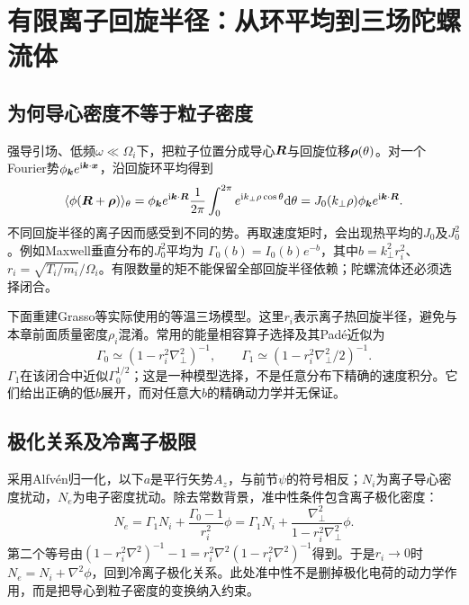 \documentclass[UTF8,a4paper,11pt,openany,fontset=fandol]{ctexbook}
\begin{document}

\section{有限离子回旋半径：从环平均到三场陀螺流体}
\subsection{为何导心密度不等于粒子密度}
强导引场、低频$\omega\ll\Omega_i$下，把粒子位置分成导心$\bm{R}$与回旋位移$\bm{\rho}(\theta)$。对一个Fourier势$\phi_{\bm{k}}e^{\mathrm i\bm{k}\cdot\bm{x}}$，沿回旋环平均得到
\begin{equation}
 \langle\phi(\bm{R}+\bm{\rho})\rangle_\theta
 =\phi_{\bm{k}}e^{\mathrm i\bm{k}\cdot\bm{R}}
 \frac1{2\pi}\int_0^{2\pi}e^{\mathrm i k_\perp\rho\cos\theta}\mathrm d\theta
 =J_0(k_\perp\rho)\phi_{\bm{k}}e^{\mathrm i\bm{k}\cdot\bm{R}}.
\end{equation}
不同回旋半径的离子因而感受到不同的势。再取速度矩时，会出现热平均的$J_0$及$J_0^2$。例如Maxwell垂直分布的$J_0^2$平均为
$\Gamma_0(b)=I_0(b)e^{-b}$，其中$b=k_\perp^2r_i^2$、$r_i=\sqrt{T_i/m_i}/\Omega_i$。有限数量的矩不能保留全部回旋半径依赖；陀螺流体还必须选择闭合。

下面重建Grasso等实际使用的等温三场模型。这里$r_i$表示离子热回旋半径，避免与本章前面质量密度$\rho_i$混淆。常用的能量相容算子选择及其Pad\'e近似为
\begin{equation}
 \Gamma_0\simeq(1-r_i^2\nabla_\perp^2)^{-1},\qquad
 \Gamma_1\simeq(1-r_i^2\nabla_\perp^2/2)^{-1}.
\end{equation}
$\Gamma_1$在该闭合中近似$\Gamma_0^{1/2}$；这是一种模型选择，不是任意分布下精确的速度积分。它们给出正确的低$b$展开，而对任意大$b$的精确动力学并无保证。

\subsection{极化关系及冷离子极限}
采用Alfvén归一化，以下$a$是平行矢势$A_z$，与前节$\psi$的符号相反；$N_i$为离子导心密度扰动，$N_e$为电子密度扰动。除去常数背景，准中性条件包含离子极化密度：
\begin{equation}
 N_e=\Gamma_1N_i+\frac{\Gamma_0-1}{r_i^2}\phi
 =\Gamma_1N_i+\frac{\nabla_\perp^2}{1-r_i^2\nabla_\perp^2}\phi.
 \label{eq:gyro_pol}
\end{equation}
第二个等号由$(1-r_i^2\nabla^2)^{-1}-1=
 r_i^2\nabla^2(1-r_i^2\nabla^2)^{-1}$得到。于是$r_i\to0$时
$N_e=N_i+\nabla^2\phi$，回到冷离子极化关系。此处准中性不是删掉极化电荷的动力学作用，而是把导心到粒子密度的变换纳入约束。
\end{document}
